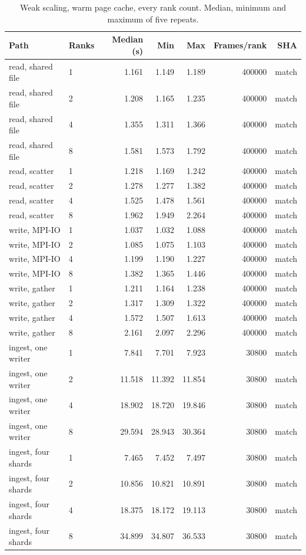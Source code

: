 \begin{table}[ht]
\centering
\scriptsize
\caption{Weak scaling, warm page cache, every rank count. Median, minimum and maximum of five repeats.}
\label{tab:mpi-weak-full}
\begin{tabular}{llrrrrr}
\toprule
Path & Ranks & Median (s) & Min & Max & Frames/rank & SHA \\
\midrule
read, shared file & 1 & 1.161 & 1.149 & 1.189 & 400000 & match \\
read, shared file & 2 & 1.208 & 1.165 & 1.235 & 400000 & match \\
read, shared file & 4 & 1.355 & 1.311 & 1.366 & 400000 & match \\
read, shared file & 8 & 1.581 & 1.573 & 1.792 & 400000 & match \\
read, scatter & 1 & 1.218 & 1.169 & 1.242 & 400000 & match \\
read, scatter & 2 & 1.278 & 1.277 & 1.382 & 400000 & match \\
read, scatter & 4 & 1.525 & 1.478 & 1.561 & 400000 & match \\
read, scatter & 8 & 1.962 & 1.949 & 2.264 & 400000 & match \\
write, MPI-IO & 1 & 1.037 & 1.032 & 1.088 & 400000 & match \\
write, MPI-IO & 2 & 1.085 & 1.075 & 1.103 & 400000 & match \\
write, MPI-IO & 4 & 1.199 & 1.190 & 1.227 & 400000 & match \\
write, MPI-IO & 8 & 1.382 & 1.365 & 1.446 & 400000 & match \\
write, gather & 1 & 1.211 & 1.164 & 1.238 & 400000 & match \\
write, gather & 2 & 1.317 & 1.309 & 1.322 & 400000 & match \\
write, gather & 4 & 1.572 & 1.507 & 1.613 & 400000 & match \\
write, gather & 8 & 2.161 & 2.097 & 2.296 & 400000 & match \\
ingest, one writer & 1 & 7.841 & 7.701 & 7.923 & 30800 & match \\
ingest, one writer & 2 & 11.518 & 11.392 & 11.854 & 30800 & match \\
ingest, one writer & 4 & 18.902 & 18.720 & 19.846 & 30800 & match \\
ingest, one writer & 8 & 29.594 & 28.943 & 30.364 & 30800 & match \\
ingest, four shards & 1 & 7.465 & 7.452 & 7.497 & 30800 & match \\
ingest, four shards & 2 & 10.856 & 10.821 & 10.891 & 30800 & match \\
ingest, four shards & 4 & 18.375 & 18.172 & 19.113 & 30800 & match \\
ingest, four shards & 8 & 34.899 & 34.807 & 36.533 & 30800 & match \\
\bottomrule
\end{tabular}
\end{table}
